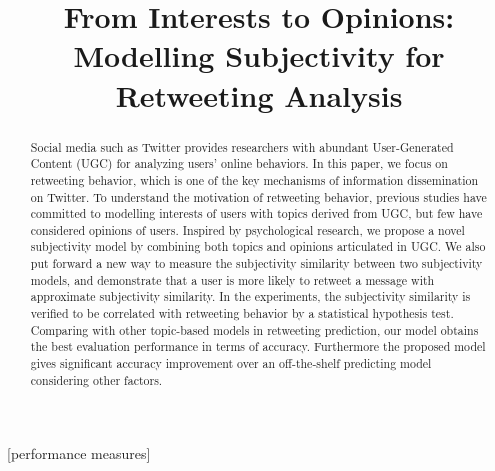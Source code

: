 \documentclass{acm_proc_article-sp}
\newcommand{\mo}[1]{\textcolor{red}{#1}}
\begin{document}
\title{From Interests to Opinions: Modelling Subjectivity for Retweeting Analysis}

\maketitle
\begin{abstract}
Social media such as Twitter provides researchers with abundant User-Generated Content (UGC) for analyzing users' online behaviors. In this paper, we focus on retweeting behavior, which is one of the key mechanisms of information dissemination on Twitter. 
To understand the motivation of retweeting behavior, previous studies have committed to modelling interests of users with topics derived from UGC, but few have considered opinions of users. 
Inspired by psychological research, we propose a novel subjectivity model by combining both topics and opinions articulated in UGC. 
We also put forward a new way to measure the subjectivity similarity between two subjectivity models, and demonstrate that a user is more likely to retweet a message with approximate subjectivity similarity.  
In the experiments, the subjectivity similarity is verified to be correlated with retweeting behavior by a statistical hypothesis test. 
Comparing with other topic-based models in retweeting prediction, our model obtains the best evaluation performance in terms of accuracy. 
Furthermore the proposed model gives significant accuracy improvement over an off-the-shelf predicting model considering other factors.
\end{abstract}
[performance measures]
\end{document}
